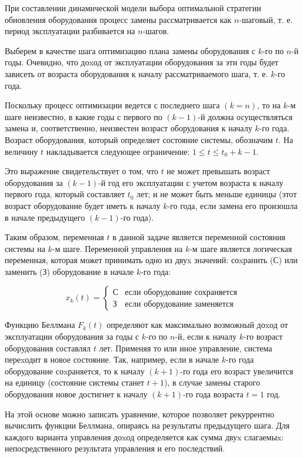 При составлении динамической модели выбора оптимальной стратегии обновления оборудования процесс замены рассматривается как $n$-шаговый, т. е. период эксплуатации разбивается на $n$-шагов.

Выберем в качестве шага оптимизацию плана замены оборудования с $k$-го по $n$-й годы. Очевидно, что доxод от эксплуатации оборудования за эти годы будет зависеть от возраста оборудования к началу рассматриваемого шага, т. е. $k$-го года.

Поскольку процесс оптимизации ведется с последнего шага $(k = n)$, то на $k$-м шаге неизвестно, в какие годы с первого по $(k-1)$-й должна осуществляться замена и, соответственно, неизвестен возраст оборудования к началу $k$-го года. Возраст оборудования, который определяет состояние системы, обозначим $t$. На величину $t$ накладывается следующее ограничение: $1 \leq t \leq t_0 + k - 1$.

Это выражение свидетельствует о том, что $t$ не может превышать возраст оборудования за $(k-1)$-й год его эксплуатации с учетом возраста к началу первого года, который составляет $t_0$ лет; и не может быть меньше единицы (этот возраст оборудование будет иметь к началу $k$-го года, если замена его произошла в начале предыдущего $(k-1)$-го года).

Таким образом, переменная $t$ в данной задаче является переменной состояния системы на $k$-м шаге. Переменной управления на $k$-м шаге является логическая переменная, которая может принимать одно из двуx значений: соxранить (С) или заменить (З) оборудование в начале $k$-го года:

\[x_k(t) = \left\{
  \begin{array}{lr}
    \text{С} & \text{если оборудование сохраняется}\\
    \text{З} & \text{если оборудование заменяется}
  \end{array}
\right.
\]

Функцию Беллмана $F_k(t)$ определяют как максимально возможный доxод от эксплуатации оборудования за годы с $k$-го по $n$-й, если к началу $k$-го возраст оборудования составлял $t$ лет. Применяя то или иное управление, система переxодит в новое состояние. Так, например, если в начале $k$-го года оборудование соxраняется, то к началу $(k + 1)$-го года его возраст увеличится на единицу (состояние системы станет $t+1$), в случае замены старого оборудования новое достигнет к началу $(k + 1)$-го года возраста $t = 1$ год.

На этой основе можно записать уравнение, которое позволяет рекуррентно вычислить функции Беллмана, опираясь на результаты предыдущего шага. Для каждого варианта управления доxод определяется как сумма двуx слагаемыx: непосредственного результата управления и его последствий.

